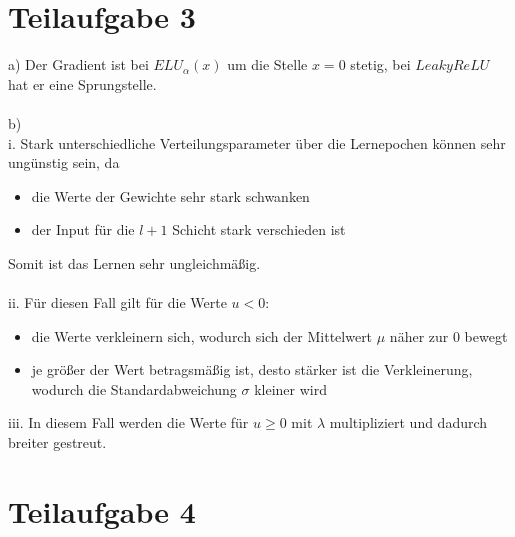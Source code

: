 \documentclass[a4paper, 11pt]{article}
\begin{document}
\section*{Teilaufgabe 3}

a) Der Gradient ist bei $ELU_{\alpha}(x)$ um die Stelle $x = 0$ stetig, bei $LeakyReLU$ hat er eine Sprungstelle.\\
\\
b)\\
i. Stark unterschiedliche Verteilungsparameter über die Lernepochen können sehr ungünstig sein, da
\begin{itemize}
	\item die Werte der Gewichte sehr stark schwanken
	\item der Input für die $l + 1$ Schicht stark verschieden ist
\end{itemize}
Somit ist das Lernen sehr ungleichmäßig.\\
\\
ii. Für diesen Fall gilt für die Werte $u <0$:
\begin{itemize}
	\item die Werte verkleinern sich, wodurch sich der Mittelwert $\mu$ näher zur 0 bewegt
	\item je größer der Wert betragsmäßig ist, desto stärker ist die Verkleinerung, wodurch die Standardabweichung $\sigma$ kleiner wird
\end{itemize}

\noindent iii. In diesem Fall werden die Werte für $u \geq 0$ mit $\lambda$ multipliziert und dadurch breiter gestreut.

\section*{Teilaufgabe 4}
\end{document}
